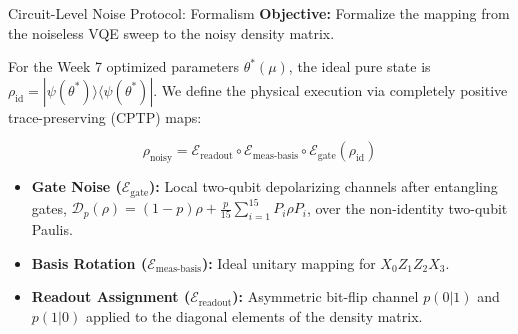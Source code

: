 \documentclass[aspectratio=169,12pt]{beamer}
\newcommand{\ket}[1]{|#1\rangle}
\newcommand{\bra}[1]{\langle#1|}
\newcommand{\dyad}[1]{\ket{#1}\bra{#1}}
\begin{document}
\begin{frame}{Circuit-Level Noise Protocol: Formalism}
    \textbf{Objective:} Formalize the mapping from the noiseless VQE sweep to the noisy density matrix.
    
    \vspace{0.3cm}
    For the Week 7 optimized parameters $\theta^*(\mu)$, the ideal pure state is $\rho_{\text{id}} = \dyad{\psi(\theta^*)}$. We define the physical execution via completely positive trace-preserving (CPTP) maps:
    
    \begin{equation}
        \rho_{\text{noisy}} = \mathcal{E}_{\text{readout}} \circ \mathcal{E}_{\text{meas-basis}} \circ \mathcal{E}_{\text{gate}} (\rho_{\text{id}})
    \end{equation}
    
    \begin{itemize}
        \item \textbf{Gate Noise ($\mathcal{E}_{\text{gate}}$):} Local two-qubit depolarizing channels after entangling gates, $\mathcal{D}_p(\rho) = (1-p)\rho + \frac{p}{15}\sum_{i=1}^{15} P_i \rho P_i$, over the non-identity two-qubit Paulis.
        \item \textbf{Basis Rotation ($\mathcal{E}_{\text{meas-basis}}$):} Ideal unitary mapping for $X_0Z_1Z_2X_3$.
        \item \textbf{Readout Assignment ($\mathcal{E}_{\text{readout}}$):} Asymmetric bit-flip channel $p(0|1)$ and $p(1|0)$ applied to the diagonal elements of the density matrix.
    \end{itemize}
\end{frame}
\end{document}
